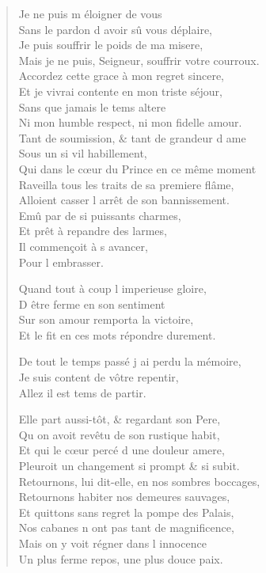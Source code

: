 \begin{verse}
\vin Je ne puis m\textquotesingle{} éloigner de vous \\
\vin Sans le pardon d\textquotesingle{} avoir sû vous déplaire, \\
\vin Je puis souffrir le poids de ma misere, \\
Mais je ne puis, Seigneur, souffrir votre courroux. \\
Accordez cette grace à mon regret sincere, \\
Et je vivrai contente en mon triste séjour, \\
\vin Sans que jamais le tems altere \\
Ni mon humble respect, ni mon fidelle amour. \\
Tant de soumission, \& tant de grandeur d\textquotesingle{} ame \\
\vin Sous un si vil habillement, \\
Qui dans le cœur du Prince en ce même moment \\
Raveilla tous les traits de sa premiere flâme, \\
Alloient casser l\textquotesingle{} arrêt de son bannissement. \\
\vin Emû par de si puissants charmes, \\
\vin Et prêt à repandre des larmes, \\
\vin Il commençoit à s\textquotesingle{} avancer, \\
\vin\vin Pour l\textquotesingle{} embrasser.

\vin Quand tout à coup l\textquotesingle{} imperieuse gloire, \\
\vin D\textquotesingle{} être ferme en son sentiment \\
\vin Sur son amour remporta la victoire, \\
Et le fit en ces mots répondre durement.

De tout le temps passé j\textquotesingle{} ai perdu la mémoire, \\
\vin Je suis content de vôtre repentir, \\
\vin Allez il est tems de partir.

Elle part aussi-tôt, \& regardant son Pere, \\
Qu\textquotesingle{} on avoit revêtu de son rustique habit, \\
Et qui le cœur percé d\textquotesingle{} une douleur amere, \\
Pleuroit un changement si prompt \& si subit. \\
Retournons, lui dit-elle, en nos sombres boccages, \\
Retournons habiter nos demeures sauvages, \\
Et quittons sans regret la pompe des Palais, \\
Nos cabanes n\textquotesingle{} ont pas tant de magnificence, \\
\vin Mais on y voit régner dans l\textquotesingle{} innocence \\
Un plus ferme repos, une plus douce paix.


\end{verse}
